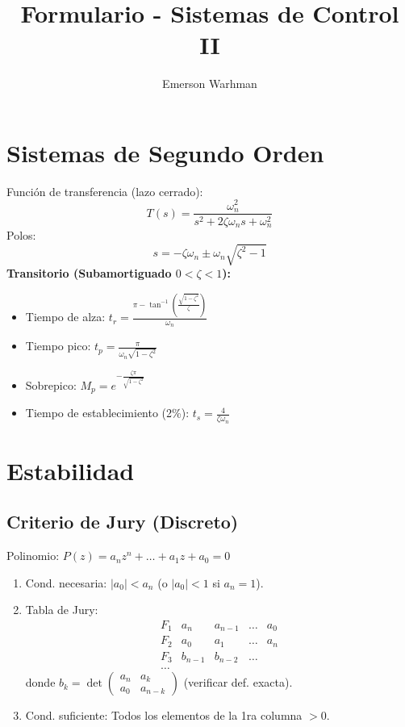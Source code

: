 \documentclass[legalpaper,twocolumn]{article}
\title{\vspace{-1cm}Formulario - Sistemas de Control II}
\author{Emerson Warhman}
\date{}
\begin{document}
\maketitle
\vspace{-1.5cm}

\section*{Sistemas de Segundo Orden}
Función de transferencia (lazo cerrado):
\[ T(s) = \frac{\omega_n^2}{s^2 + 2\zeta \omega_n s + \omega_n^2} \]
Polos:
\[ s = -\zeta \omega_n \pm \omega_n \sqrt{\zeta^2 - 1} \]
\textbf{Transitorio (Subamortiguado $0 < \zeta < 1$):}
\begin{itemize}[leftmargin=*]
    \item Tiempo de alza: \( t_r = \frac{\pi - \tan^{-1}(\frac{\sqrt{1-\zeta^2}}{\zeta})}{\omega_n} \)
    \item Tiempo pico: \( t_p = \frac{\pi}{\omega_n \sqrt{1-\zeta^2}} \)
    \item Sobrepico: \( M_p = e^{-\frac{\zeta \pi}{\sqrt{1-\zeta^2}}} \)
    \item Tiempo de establecimiento (2\%): \( t_s = \frac{4}{\zeta \omega_n} \)
\end{itemize}

\section*{Estabilidad}
\subsection*{Criterio de Jury (Discreto)}
Polinomio: \( P(z) = a_n z^n + \dots + a_1 z + a_0 = 0 \)
\begin{enumerate}[leftmargin=*]
    \item Cond. necesaria: \( |a_0| < a_n \) (o $|a_0| < 1$ si $a_n=1$).
    \item Tabla de Jury:
    \[
    \begin{array}{c|ccccc}
        F_1 & a_n & a_{n-1} & \dots & a_0 \\
        F_2 & a_0 & a_1 & \dots & a_n \\
        F_3 & b_{n-1} & b_{n-2} & \dots & \\
        \dots & & & & 
    \end{array}
    \]
    donde \( b_k = \det \begin{pmatrix} a_n & a_k \\ a_0 & a_{n-k} \end{pmatrix} \) (verificar def. exacta).
    \item Cond. suficiente: Todos los elementos de la 1ra columna $>0$.
\end{enumerate}
\end{document}
